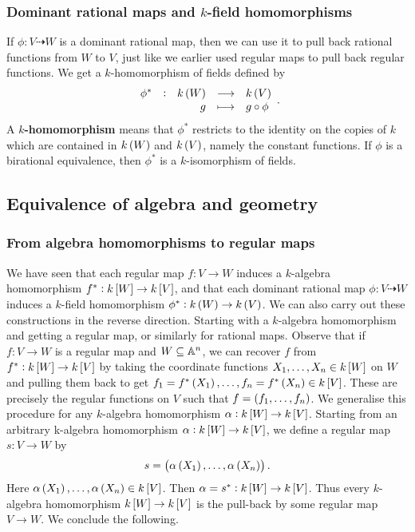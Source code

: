 \subsubsection{Dominant rational maps and \texorpdfstring{$ k $}{k}-field homomorphisms}

If $ \phi : V \dashrightarrow W $ is a dominant rational map, then we can use it to pull back rational functions from $ W $ to $ V $, just like we earlier used regular maps to pull back regular functions. We get a $ k $-homomorphism of fields defined by
$$ \function[\phi^*]{k\br{W}}{k\br{V}}{g}{g \circ \phi}. $$
A \textbf{$ k $-homomorphism} means that $ \phi^* $ restricts to the identity on the copies of $ k $ which are contained in $ k\br{W} $ and $ k\br{V} $, namely the constant functions. If $ \phi $ is a birational equivalence, then $ \phi^* $ is a $ k $-isomorphism of fields.

\subsection{Equivalence of algebra and geometry}

\subsubsection{From algebra homomorphisms to regular maps}

We have seen that each regular map $ f : V \to W $ induces a $ k $-algebra homomorphism $ f^* : k\sbr{W} \to k\sbr{V} $, and that each dominant rational map $ \phi : V \dashrightarrow W $ induces a $ k $-field homomorphism $ \phi^* : k\br{W} \to k\br{V} $. We can also carry out these constructions in the reverse direction. Starting with a $ k $-algebra homomorphism and getting a regular map, or similarly for rational maps. Observe that if $ f : V \to W $ is a regular map and $ W \subseteq \AA^n $, we can recover $ f $ from $ f^* : k\sbr{W} \to k\sbr{V} $ by taking the coordinate functions $ X_1, \dots, X_n \in k\sbr{W} $ on $ W $ and pulling them back to get $ f_1 = f^*\br{X_1}, \dots, f_n = f^*\br{X_n} \in k\sbr{V} $. These are precisely the regular functions on $ V $ such that $ f = \br{f_1, \dots, f_n} $. We generalise this procedure for any $ k $-algebra homomorphism $ \alpha : k\sbr{W} \to k\sbr{V} $. Starting from an arbitrary k-algebra homomorphism $ \alpha : k\sbr{W} \to k\sbr{V} $, we define a regular map $ s : V \to W $ by
$$ s = \br{\alpha\br{X_1}, \dots, \alpha\br{X_n}}. $$
Here $ \alpha\br{X_1}, \dots, \alpha\br{X_n} \in k\sbr{V} $. Then $ \alpha = s^* : k\sbr{W} \to k\sbr{V} $. Thus every $ k $-algebra homomorphism $ k\sbr{W} \to k\sbr{V} $ is the pull-back by some regular map $ V \to W $. We conclude the following.

